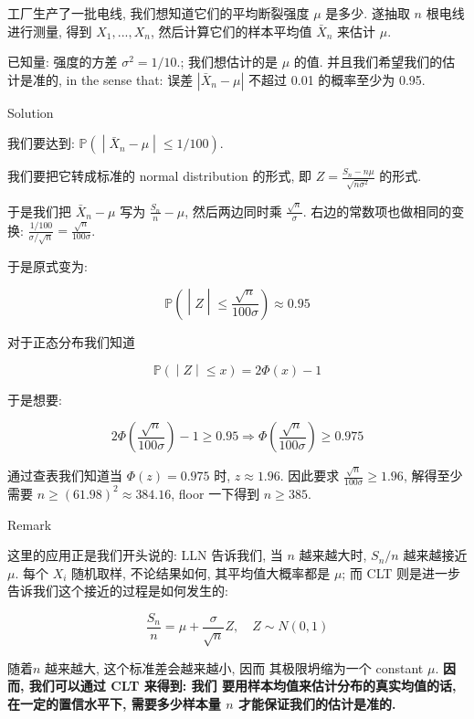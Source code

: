 \documentclass{qlnotes-export}
\begin{document}
\begin{example}[(样本量需求的计算)]\label{ex-05-clt}

工厂生产了一批电线, 我们想知道它们的平均断裂强度 \(\mu\) 是多少. 遂抽取 \(n\) 根电线进行测量, 得到 \(X_{1},...,X_{n}\), 然后计算它们的样本平均值 \({\bar{X}}_{n}\) 来估计 \(\mu\).

已知量: 强度的方差 \(\sigma^{2} = 1/10\).; 我们想估计的是 \(\mu\) 的值. 并且我们希望我们的估计是准的, in the sense that: 误差 \(|{\bar{X}}_{n} - \mu|\) 不超过 0.01 的概率至少为 0.95.

\begin{qlsolution}{Solution}

我们要达到: \(\left. {\mathbb{P}}( \middle| {\bar{X}}_{n} - \mu \middle| \leq 1/100) \right.\).

我们要把它转成标准的 normal distribution 的形式, 即 \(Z = \frac{S_{n} - n\mu}{\sqrt{n\sigma^{2}}}\) 的形式.

于是我们把 \({\bar{X}}_{n} - \mu\) 写为 \(\frac{S_{n}}{n} - \mu\), 然后两边同时乘 \(\frac{\sqrt{n}}{\sigma}\). 右边的常数项也做相同的变换: \(\frac{1/100}{\sigma/\sqrt{n}} = \frac{\sqrt{n}}{100\sigma}\).

于是原式变为:

\[\left. {\mathbb{P}}( \middle| Z \middle| \leq \frac{\sqrt{n}}{100\sigma}) \approx 0.95 \right.\]

对于正态分布我们知道

\[\left. {\mathbb{P}}( \middle| Z \middle| \leq x) = 2\Phi(x) - 1 \right.\]

于是想要:

\[2\Phi\left( \frac{\sqrt{n}}{100\sigma} \right) - 1 \geq 0.95\Longrightarrow\Phi\left( \frac{\sqrt{n}}{100\sigma} \right) \geq 0.975\]

通过查表我们知道当 \(\Phi(z) = 0.975\) 时, \(z \approx 1.96\). 因此要求 \(\frac{\sqrt{n}}{100\sigma} \geq 1.96\), 解得至少需要 \(n \geq (61.98)^{2} \approx 384.16\), floor 一下得到 \(n \geq 385\).

\end{qlsolution}

\begin{qlremark}{Remark}

这里的应用正是我们开头说的: LLN 告诉我们, 当 \(n\) 越来越大时, \(S_{n}/n\) 越来越接近 \(\mu\). 每个 \(X_{i}\) 随机取样, 不论结果如何, 其平均值大概率都是 \(\mu\); 而 CLT 则是进一步告诉我们这个接近的过程是如何发生的:

\[\frac{S_{n}}{n} = \mu + \frac{\sigma}{\sqrt{n}}Z,\quad Z \sim N(0,1)\]

随着\(n\) 越来越大, 这个标准差会越来越小, 因而 其极限坍缩为一个 constant \(\mu\). \textbf{因而, 我们可以通过 CLT 来得到: 我们 要用样本均值来估计分布的真实均值的话, 在一定的置信水平下, 需要多少样本量 \(n\) 才能保证我们的估计是准的.}

\end{qlremark}

\end{example}
\end{document}
